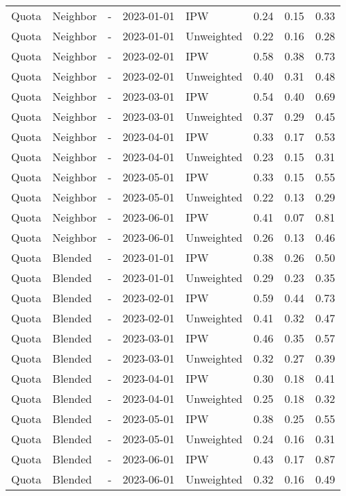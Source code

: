 \begin{longtable}[t]{lllllrrr}
Quota & Neighbor & - & 2023-01-01 & IPW & 0.24 & 0.15 & 0.33\\
Quota & Neighbor & - & 2023-01-01 & Unweighted & 0.22 & 0.16 & 0.28\\
\addlinespace
Quota & Neighbor & - & 2023-02-01 & IPW & 0.58 & 0.38 & 0.73\\
Quota & Neighbor & - & 2023-02-01 & Unweighted & 0.40 & 0.31 & 0.48\\
Quota & Neighbor & - & 2023-03-01 & IPW & 0.54 & 0.40 & 0.69\\
Quota & Neighbor & - & 2023-03-01 & Unweighted & 0.37 & 0.29 & 0.45\\
Quota & Neighbor & - & 2023-04-01 & IPW & 0.33 & 0.17 & 0.53\\
\addlinespace
Quota & Neighbor & - & 2023-04-01 & Unweighted & 0.23 & 0.15 & 0.31\\
Quota & Neighbor & - & 2023-05-01 & IPW & 0.33 & 0.15 & 0.55\\
Quota & Neighbor & - & 2023-05-01 & Unweighted & 0.22 & 0.13 & 0.29\\
Quota & Neighbor & - & 2023-06-01 & IPW & 0.41 & 0.07 & 0.81\\
Quota & Neighbor & - & 2023-06-01 & Unweighted & 0.26 & 0.13 & 0.46\\
\addlinespace
Quota & Blended & - & 2023-01-01 & IPW & 0.38 & 0.26 & 0.50\\
Quota & Blended & - & 2023-01-01 & Unweighted & 0.29 & 0.23 & 0.35\\
Quota & Blended & - & 2023-02-01 & IPW & 0.59 & 0.44 & 0.73\\
Quota & Blended & - & 2023-02-01 & Unweighted & 0.41 & 0.32 & 0.47\\
Quota & Blended & - & 2023-03-01 & IPW & 0.46 & 0.35 & 0.57\\
\addlinespace
Quota & Blended & - & 2023-03-01 & Unweighted & 0.32 & 0.27 & 0.39\\
Quota & Blended & - & 2023-04-01 & IPW & 0.30 & 0.18 & 0.41\\
Quota & Blended & - & 2023-04-01 & Unweighted & 0.25 & 0.18 & 0.32\\
Quota & Blended & - & 2023-05-01 & IPW & 0.38 & 0.25 & 0.55\\
Quota & Blended & - & 2023-05-01 & Unweighted & 0.24 & 0.16 & 0.31\\
\addlinespace
Quota & Blended & - & 2023-06-01 & IPW & 0.43 & 0.17 & 0.87\\
Quota & Blended & - & 2023-06-01 & Unweighted & 0.32 & 0.16 & 0.49\\*
\end{longtable}
